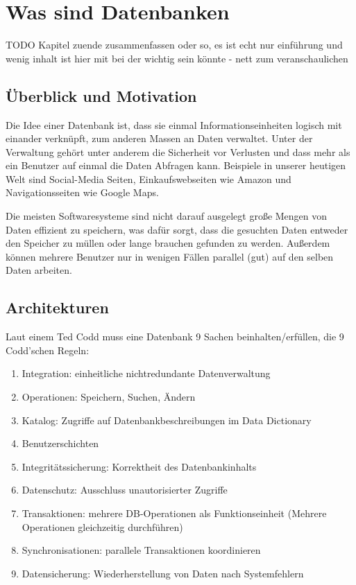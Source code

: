 \documentclass[12pt,a4paper]{article} %
\begin{document}
	\tableofcontents
	
	\newpage
	\section{Was sind Datenbanken}
	TODO Kapitel zuende zusammenfassen oder so, es ist echt nur einführung und wenig inhalt ist hier mit bei der wichtig sein könnte - nett zum veranschaulichen
	\subsection{Überblick und Motivation}
	Die Idee einer Datenbank ist, dass sie einmal Informationseinheiten logisch mit einander verknüpft, zum anderen Massen an Daten verwaltet. Unter der Verwaltung gehört unter anderem die Sicherheit vor Verlusten und dass mehr als ein Benutzer auf einmal die Daten Abfragen kann. Beispiele in unserer heutigen Welt sind Social-Media Seiten, Einkaufswebseiten wie Amazon und Navigationsseiten wie Google Maps. 
	
	Die meisten Softwaresysteme sind nicht darauf ausgelegt große Mengen von Daten effizient zu speichern, was dafür sorgt, dass die gesuchten Daten entweder den Speicher zu müllen oder lange brauchen gefunden zu werden. Außerdem können mehrere Benutzer nur in wenigen Fällen parallel (gut) auf den selben Daten arbeiten. 
	
	\subsection{Architekturen}
	Laut einem  Ted Codd muss eine Datenbank 9 Sachen beinhalten/erfüllen, die 9 Codd'schen Regeln:
	\begin{enumerate}
		\item Integration: einheitliche nichtredundante Datenverwaltung
		\item Operationen: Speichern, Suchen, Ändern
		\item Katalog: Zugriffe auf Datenbankbeschreibungen im Data Dictionary
		\item Benutzerschichten
		\item Integritätssicherung: Korrektheit des Datenbankinhalts
		\item Datenschutz: Ausschluss unautorisierter Zugriffe
		\item Transaktionen: mehrere DB-Operationen als Funktionseinheit (Mehrere Operationen gleichzeitig durchführen)
		\item Synchronisationen: parallele Transaktionen koordinieren
		\item Datensicherung: Wiederherstellung von Daten nach Systemfehlern
	\end{enumerate}
	
\end{document}
